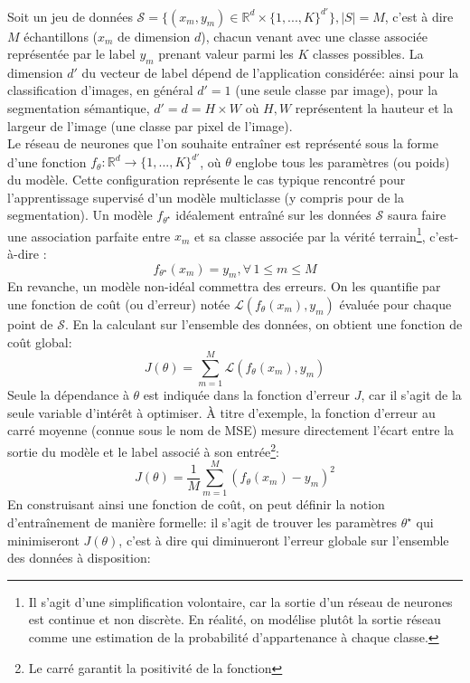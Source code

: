 Soit un jeu de données $\mathcal{S} = \{ (x_m, y_m) \in \mathbb{R}^d \times \{1, ...,K\}^{d'}\}, |S|=M$, c'est à dire $M$ échantillons ($x_m$ de dimension $d$), chacun venant avec une classe associée représentée par le label $y_m$ prenant valeur parmi les $K$ classes possibles. La dimension $d'$ du vecteur de label dépend de l'application considérée: ainsi pour la classification d'images, en général $d'=1$ (une seule classe par image), pour la segmentation sémantique, $d'=d=H\times W$ où $H, W$ représentent la hauteur et la largeur de l'image (une classe par pixel de l'image). \\
Le réseau de neurones que l'on souhaite entraîner est représenté sous la forme d'une fonction $f_\theta: \mathbb{R}^d \to  \{1, ...,K\}^{d'}$, où $\theta$ englobe tous les paramètres (ou poids) du modèle. 
Cette configuration représente le cas typique rencontré pour l'apprentissage supervisé d'un modèle multiclasse (y compris pour de la segmentation).
Un modèle $f_{\theta^\star}$ idéalement entraîné sur les données $\mathcal{S}$ saura faire une association parfaite entre $x_m$ et sa classe associée par la vérité terrain\footnote{Il s'agit d'une simplification volontaire, car la sortie d'un réseau de neurones est continue et non discrète. En réalité, on modélise plutôt la sortie réseau comme une estimation de la probabilité d'appartenance à chaque classe.}, c'est-à-dire : 
\begin{equation}
	f_{\theta^\star}(x_m) = y_m, \forall\, 1 \leq m \leq M
\end{equation} 
En revanche, un modèle non-idéal commettra des erreurs. On les quantifie par une fonction de coût (ou d'erreur) notée $\mathcal{L}(f_\theta(x_m), y_m)$ évaluée pour chaque point de $\mathcal{S}$. En la calculant sur l'ensemble des données, on obtient une fonction de coût global:
\begin{equation}
	J(\theta) = \sum_{m=1}^{M} \mathcal{L}(f_\theta(x_m), y_m)
\end{equation}
Seule la dépendance à $\theta$ est indiquée dans la fonction d'erreur $J$, car il s'agit de la seule variable d'intérêt à optimiser. 
À titre d'exemple, la fonction d'erreur au carré moyenne (connue sous le nom de \ac{MSE}) mesure directement l'écart entre la sortie du modèle et le label associé à son entrée\footnote{Le carré garantit la positivité de la fonction}:
\begin{equation}
	J(\theta) = \frac{1}{M}\sum_{m=1}^{M}(f_\theta(x_m) - y_m)^2
\end{equation}
En construisant ainsi une fonction de coût, on peut définir la notion d'entraînement de manière formelle: il s'agit de trouver les paramètres $\theta^\star$ qui minimiseront $J(\theta)$, c'est à dire qui diminueront l'erreur globale sur l'ensemble des données à disposition:
